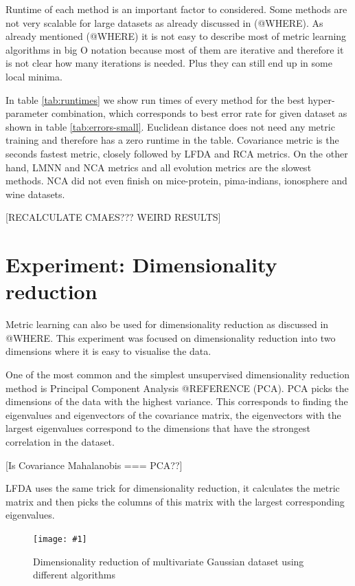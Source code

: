 \documentclass[12pt,a4paper]{report}
\newcommand{\cenfig}[3]{
\begin{figure}[ht]
	\centering
    \texttt{[image: \#1]}
    \caption{#2} \label{#3}
\end{figure}
}
\begin{document}
Runtime of each method is an important factor to considered. Some methods are not very scalable for large datasets as already discussed in (@WHERE). As already mentioned (@WHERE) it is not easy to describe most of metric learning algorithms in big O notation because most of them are iterative and therefore it is not clear how many iterations is needed. Plus they can still end up in some local minima.

In table \ref{tab:runtimes} we show run times of every method for the best hyper-parameter combination, which corresponds to best error rate for given dataset as shown in table \ref{tab:errors-small}. Euclidean distance does not need any metric training and therefore has a zero runtime in the table. Covariance metric is the seconds fastest metric, closely followed by LFDA and RCA metrics. On the other hand, LMNN and NCA metrics and all evolution metrics are the slowest methods. NCA did not even finish on mice-protein, pima-indians, ionosphere and wine datasets.

[RECALCULATE CMAES??? WEIRD RESULTS] %



\section{Experiment: Dimensionality reduction} \label{chap:exp:dimred}

Metric learning can also be used for dimensionality reduction as discussed in @WHERE. This experiment was focused on dimensionality reduction into two dimensions where it is easy to visualise the data.

One of the most common and the simplest unsupervised dimensionality reduction method is Principal Component Analysis @REFERENCE (PCA). PCA picks the dimensions of the data with the highest variance. This corresponds to finding the eigenvalues and eigenvectors of the covariance matrix, the eigenvectors with the largest eigenvalues correspond to the dimensions that have the strongest correlation in the dataset.

[Is Covariance Mahalanobis === PCA??]

LFDA uses the same trick for dimensionality reduction, it calculates the metric matrix and then picks the columns of this matrix with the largest corresponding eigenvalues.

\cenfig{graphs/dimred/gaussians}{Dimensionality reduction of multivariate Gaussian dataset using different algorithms}{fig:dimred:gauss}
\end{document}
